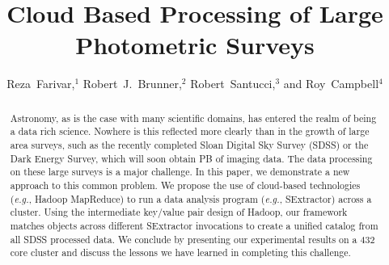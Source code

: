 
\resetcounters




\title{Cloud Based Processing of Large Photometric Surveys}
\author{Reza~Farivar,$^1$ Robert~J.~Brunner,$^2$ Robert~Santucci,$^3$ and Roy~Campbell$^4$
}


\begin{abstract}
Astronomy, as is the case with many scientific domains, has entered the realm of being a data rich science. Nowhere is this reflected more clearly than in the growth of large area surveys, such as the recently completed Sloan Digital Sky Survey (SDSS) or the Dark Energy Survey, which will soon obtain PB of imaging data. The data processing on these large surveys is a major challenge. In this paper, we demonstrate a new approach to this common problem. We propose the use of cloud-based technologies (\textit{e.g.}, Hadoop MapReduce) to run a data analysis program (\textit{e.g.}, SExtractor) across a cluster. Using the intermediate key/value pair design of Hadoop, our framework matches objects across different SExtractor invocations to create a unified catalog from all SDSS processed data. We conclude by presenting our experimental results on a 432 core cluster and discuss the lessons we have learned in completing this challenge.
\end{abstract}

